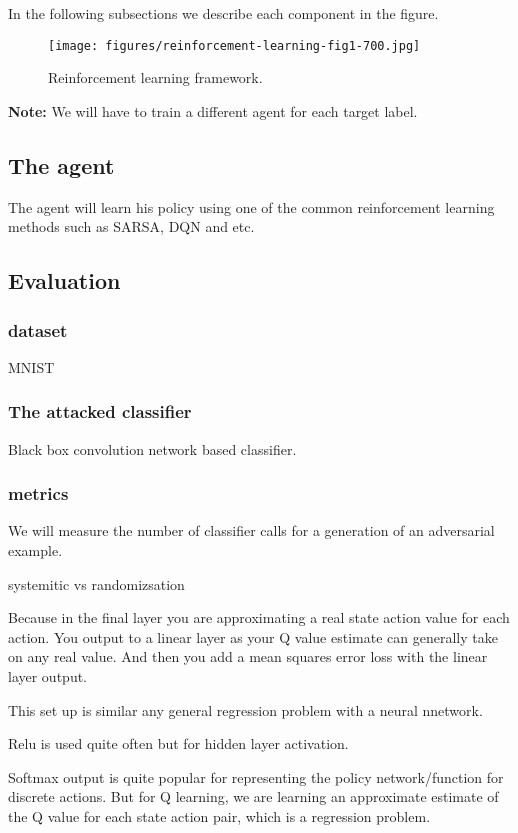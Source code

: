 \documentclass{article}
\begin{document}
In the following subsections we describe each component in the figure.

\begin{figure}[H]
    \centering
        \texttt{[image: figures/reinforcement-learning-fig1-700.jpg]}
    \caption{Reinforcement learning framework.}
    \label{fig:rl_model}
\end{figure}

\textbf{Note:} We will have to train a different agent for each target label. \\




\subsection{The agent}
The agent will learn his policy using one of the common reinforcement learning methods such as SARSA, DQN and etc.

\subsection{Evaluation}
\subsubsection{dataset}
MNIST

\subsubsection{The attacked classifier}
Black box convolution network based classifier.

\subsubsection{metrics}
We will measure the number of classifier calls for a generation of an adversarial example.

systemitic vs randomizsation

Because in the final layer you are approximating a real state action value for each action. You output to a linear layer as your Q value estimate can generally take on any real value. And then you add a mean squares error loss with the linear layer output.

This set up is similar any general regression problem with a neural nnetwork.

Relu is used quite often but for hidden layer activation.

Softmax output is quite popular for representing the policy network/function for discrete actions. But for Q learning, we are learning an approximate estimate of the Q value for each state action pair, which is a regression problem.
\end{document}
